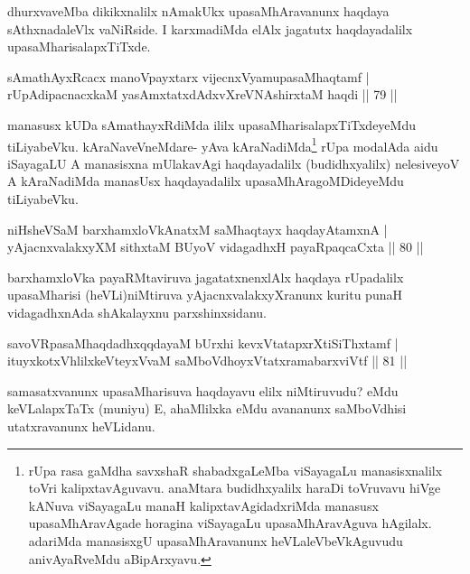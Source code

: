 \begin{artha}
dhurxvaveMba dikikxnalilx nAmakUkx upasaMhAravanunx haqdaya sAthxnadaleVlx vaNiRside. I karxmadiMda elAlx jagatutx haqdayadalilx upasaMharisalapxTiTxde.
\end{artha}


\begin{shl}
sAmathAyxRcacx manoV\s payxtarx vijecnxVyamupasaMhaqtamf |\\
rUpAdipacnacxkaM yasAmxtatxdAdxvXreVNA\s \s shirxtaM haqdi \hfill || 79 ||
\end{shl}

\begin{artha}
manasusx kUDa sAmathayxRdiMda ililx upasaMharisalapxTiTxdeyeMdu tiLiyabeVku. kAraNaveVneMdare- yAva kAraNadiMda\footnote{rUpa rasa gaMdha savxshaR shabadxgaLeMba viSayagaLu manasisxnalilx toVri kalipxtavAguvavu. anaMtara budidhxyalilx haraDi toVruvavu hiVge kANuva viSayagaLu manaH kalipxtavAgidadxriMda manasusx upasaMhAravAgade horagina viSayagaLu upasaMhAravAguva hAgilalx. adariMda manasisxgU upasaMhAravanunx heVLaleVbeVkAguvudu anivAyaRveMdu aBipArxyavu.} rUpa modalAda aidu iSayagaLU A manasisxna mUlakavAgi haqdayadalilx (budidhxyalilx) nelesiveyoV A kAraNadiMda manasUsx haqdayadalilx upasaMhAragoMDideyeMdu tiLiyabeVku.
\end{artha}%

\begin{shl}
niHsheVSaM barxhamxloVkAnatxM saMhaqtayx haqdayAtamxnA |\\
yAjacnxvalakxyXM sithxtaM BUyoV vidagadhxH payaRpaqcaCxta \hfill || 80 ||
\end{shl}

\begin{artha}
barxhamxloVka payaRMtaviruva jagatatxnenxlAlx haqdaya rUpadalilx upasaMharisi (heVLi)niMtiruva yAjacnxvalakxyXranunx kuritu punaH vidagadhxnAda shAkalayxnu parxshinxsidanu.
\end{artha}

\begin{shl}
savoVRpasaMhaqdadhxqqdayaM bUrxhi kevxVtatapxrXtiSiThxtamf |\\
ituyxkotxV\s hlilxkeVteyxVvaM saMboVdhoyxVtatxramabarxviVtf \hfill || 81 ||
\end{shl}

\begin{artha}
samasatxvanunx upasaMharisuva haqdayavu elilx niMtiruvudu? eMdu keVLalapxTaTx (muniyu) E, ahaMlilxka eMdu avananunx saMboVdhisi utatxravanunx heVLidanu.
\end{artha}

